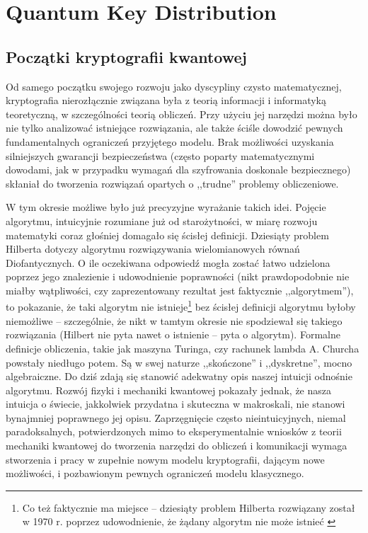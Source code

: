 \documentclass[10pt]{article}
\begin{document}

\section{Quantum Key Distribution}

\subsection{Początki kryptografii kwantowej}

Od samego początku swojego rozwoju jako dyscypliny czysto matematycznej, kryptografia nierozłącznie
związana była z teorią informacji i informatyką teoretyczną, w szczególności teorią obliczeń. Przy
użyciu jej narzędzi można było nie tylko analizować istniejące rozwiązania, ale także ściśle
dowodzić pewnych fundamentalnych ograniczeń przyjętego modelu. Brak możliwości uzyskania silniejszych
gwarancji bezpieczeństwa (często poparty matematycznymi dowodami, jak w przypadku wymagań dla 
szyfrowania doskonale bezpiecznego) skłaniał do tworzenia rozwiązań opartych o ,,trudne'' problemy
obliczeniowe. 

W tym okresie możliwe było już precyzyjne wyrażanie
takich idei. Pojęcie algorytmu, intuicyjnie rozumiane już od starożytności, w miarę rozwoju 
matematyki coraz głośniej domagało się ścisłej definicji. Dziesiąty problem Hilberta\cite{Gray01}
dotyczy algorytmu rozwiązywania wielomianowych równań Diofantycznych. O ile oczekiwana odpowiedź 
mogła zostać łatwo udzielona poprzez jego znalezienie i udowodnienie poprawności (nikt prawdopodobnie
nie miałby wątpliwości, czy zaprezentowany rezultat jest faktycznie ,,algorytmem''), to pokazanie,
że taki algorytm nie istnieje\footnote{Co też faktycznie ma miejsce -- dziesiąty problem Hilberta
rozwiązany został w 1970 r. poprzez udowodnienie, że żądany algorytm nie może istnieć 
\cite{Matiyasevich70}} bez ścisłej definicji algorytmu byłoby niemożliwe -- szczególnie,
że nikt w tamtym okresie nie spodziewał się takiego rozwiązania (Hilbert nie pyta nawet o istnienie
-- pyta o algorytm\footnotemark). Formalne definicje obliczenia, takie jak maszyna Turinga, czy rachunek
lambda A. Churcha powstały niedługo potem. Są w swej naturze ,,skończone'' i ,,dyskretne'', mocno
algebraiczne. Do dziś zdają się stanowić adekwatny opis naszej intuicji odnośnie algorytmu. Rozwój 
fizyki i mechaniki kwantowej pokazały jednak, że nasza intuicja o świecie, jakkolwiek przydatna 
i skuteczna w makroskali, nie stanowi bynajmniej poprawnego jej opisu. Zaprzęgnięcie często 
nieintuicyjnych, niemal paradoksalnych, potwierdzonych mimo to eksperymentalnie wniosków z teorii 
mechaniki kwantowej do tworzenia narzędzi do obliczeń i komunikacji wymaga stworzenia i pracy w 
zupełnie nowym modelu kryptografii, dającym nowe możliwości, i pozbawionym pewnych ograniczeń modelu
klasycznego.
 
\end{document}
